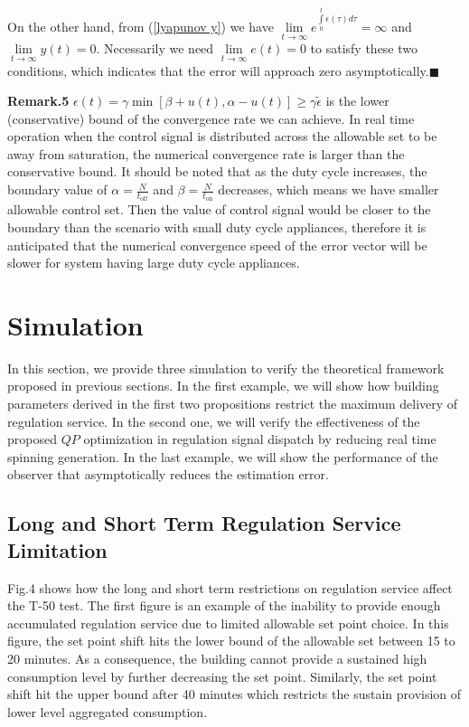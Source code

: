 \documentclass[journal]{IEEEtran}
\begin{document}
On the other hand, from (\ref{lyapunov y}) we have $\lim\limits_{t\rightarrow\infty}e^{\int\limits_{0}^{t}\epsilon(\tau)d \tau}=\infty$ and $\lim\limits_{t\rightarrow\infty}y(t)=0$. Necessarily we need $\lim\limits_{t\rightarrow \infty}e(t)=0$ to satisfy these two conditions, which indicates that the error will approach zero asymptotically.$\blacksquare$

\textbf{Remark.5} $\epsilon(t)=\gamma\min [\beta+u(t),\alpha-u(t)]\geq \gamma\tilde{\epsilon}$ is the lower (conservative) bound of the convergence rate we can achieve. In real time operation when the control signal is distributed across the allowable set to be away from saturation, the numerical convergence rate is larger than the conservative bound. It should be noted that as the duty cycle increases, the boundary value of $\alpha=\frac{\displaystyle N}{\displaystyle t_{\textrm{off}}}$ and $\beta=\frac{\displaystyle N}{\displaystyle t_{\textrm{on}}}$ decreases, which means we have smaller allowable control set. Then the value of control signal would be closer to the boundary than the scenario with small duty cycle appliances, therefore it is anticipated that the numerical convergence speed of the error vector will be slower for system having large duty cycle appliances.




\section{Simulation}
In this section, we provide three simulation to verify the theoretical framework proposed in previous sections. In the first example, we will show how building parameters derived in the first two propositions restrict the maximum delivery of regulation service. In the second one, we will verify the effectiveness of the proposed $QP$ optimization in regulation signal dispatch by reducing real time spinning generation. In the last example, we will show the performance of the observer that asymptotically reduces the estimation error.
\label{simulation section}
\subsection{Long and Short Term Regulation Service Limitation}
Fig.4 shows how the long and short term restrictions on regulation service affect the T-50 test. The first figure is an example of the inability to provide enough accumulated regulation service due to limited allowable set point choice. In this figure, the set point shift hits the lower bound of the allowable set between 15 to 20 minutes. As a consequence, the building cannot provide a sustained high consumption level by further decreasing the set point. Similarly, the set point shift hit the upper bound after 40 minutes which restricts the sustain provision of lower level aggregated consumption.  
\end{document}
